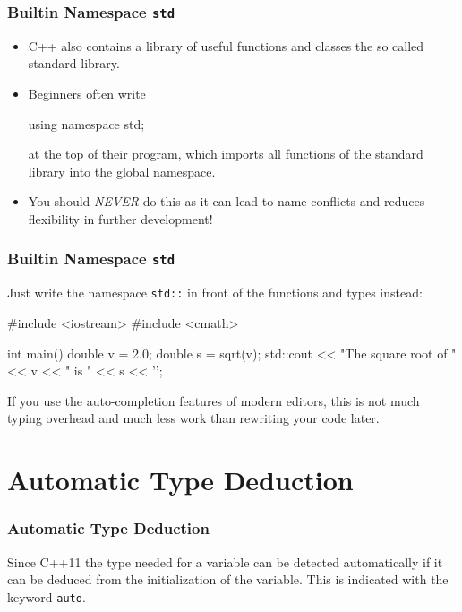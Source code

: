 \documentclass[aspectratio=169,ignorenonframetext,11pt]{beamer}
\def\inline{\lstinline[basicstyle=\small\ttfamily]}
\begin{document}
\begin{frame}[fragile]
  \frametitle{Builtin Namespace \texttt{std}}
  \begin{itemize}
  \item C++ also contains a library of useful functions and classes the so called standard library. 
  \item Beginners often write 
  \begin{cppcode}
  using namespace std;
  \end{cppcode}
at the top of their program, which imports all functions of the standard library into the global namespace.
  \item You should \emph{NEVER} do this as it can lead to name conflicts and reduces flexibility in further development!
  \end{itemize}
  
\end{frame}

\begin{frame}[fragile]
  \frametitle<presentation>{Builtin Namespace \texttt{std}}
Just write the namespace \inline!std::! in front of the functions and types instead:
  \begin{cppcode}
#include <iostream>
#include <cmath>

int main()
{
  double v = 2.0;
  double s = sqrt(v);
  std::cout << "The square root of " << v
            << " is " << s << '\n';
}
  \end{cppcode}
  If you use the auto-completion features of modern editors, this is not much typing overhead and much less work than rewriting your code later.
\end{frame}

\section{Automatic Type Deduction}

\begin{frame}
\frametitle<presentation>{Automatic Type Deduction}

Since C++11 the type needed for a variable can be detected automatically if it can be deduced from the initialization of the variable. This is indicated with the keyword \inline!auto!.

\begin{codeblock}
  
\end{codeblock}
\end{frame}
\end{document}
